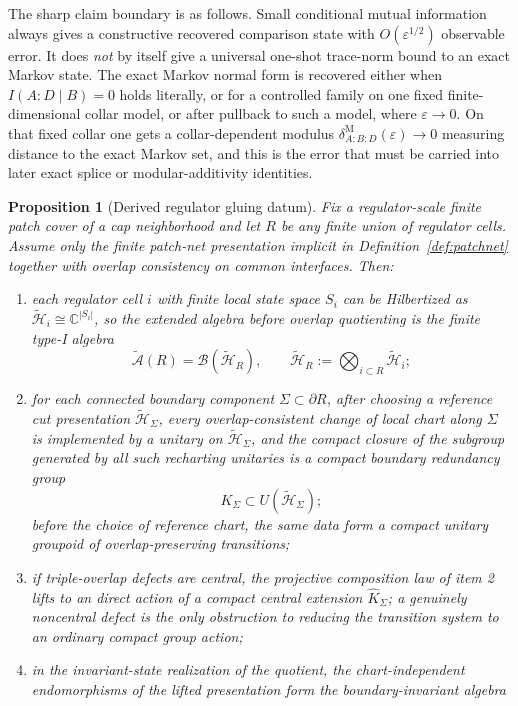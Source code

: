 \documentclass[11pt]{article}
\newtheorem{proposition}[theorem]{Proposition}
\begin{document}
The sharp claim boundary is as follows. Small conditional mutual information always gives a constructive recovered comparison state with \(O(\varepsilon^{1/2})\) observable error. It does \emph{not} by itself give a universal one-shot trace-norm bound to an exact Markov state. The exact Markov normal form is recovered either when \(I(A:D\mid B)=0\) holds literally, or for a controlled family on one fixed finite-dimensional collar model, or after pullback to such a model, where \(\varepsilon\to0\). On that fixed collar one gets a collar-dependent modulus \(\delta^{\mathrm M}_{A:B:D}(\varepsilon)\to0\) measuring distance to the exact Markov set, and this is the error that must be carried into later exact splice or modular-additivity identities.

\begin{proposition}[Derived regulator gluing datum]\label{prop:regulatedrealization}
Fix a regulator-scale finite patch cover of a cap neighborhood and let \(R\) be any finite union of regulator cells. Assume only the finite patch-net presentation implicit in Definition~\ref{def:patchnet} together with overlap consistency on common interfaces. Then:
\begin{enumerate}[leftmargin=2em]
\item each regulator cell \(i\) with finite local state space \(S_i\) can be Hilbertized as \(\tilde{\mathcal H}_i\cong \mathbb C^{|S_i|}\), so the extended algebra before overlap quotienting is the finite type-I algebra
\[
\widetilde{\mathcal A}(R)=\mathcal B(\tilde{\mathcal H}_R),
\qquad
\tilde{\mathcal H}_R:=\bigotimes_{i\subset R}\tilde{\mathcal H}_i;
\]
\item for each connected boundary component \(\Sigma\subset\partial R\), after choosing a reference cut presentation \(\tilde{\mathcal H}_\Sigma\), every overlap-consistent change of local chart along \(\Sigma\) is implemented by a unitary on \(\tilde{\mathcal H}_\Sigma\), and the compact closure of the subgroup generated by all such recharting unitaries is a compact boundary redundancy group
\[
K_\Sigma\subset U(\tilde{\mathcal H}_\Sigma);
\]
before the choice of reference chart, the same data form a compact unitary groupoid of overlap-preserving transitions;
\item if triple-overlap defects are central, the projective composition law of item 2 lifts to an direct action of a compact central extension \(\widehat K_\Sigma\); a genuinely noncentral defect is the only obstruction to reducing the transition system to an ordinary compact group action;
\item in the invariant-state realization of the quotient, the chart-independent endomorphisms of the lifted presentation form the boundary-invariant algebra

\end{enumerate}
\end{proposition}
\end{document}
